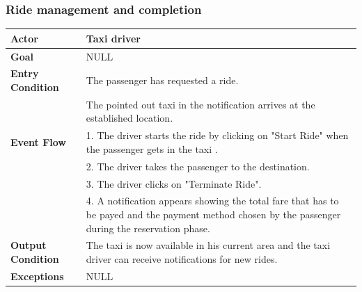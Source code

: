 \documentclass{article}
\begin{document}
\subsubsection{Ride management and completion}
\begin{tabular}{| l | p{8cm} |}
\hline
\textbf{Actor}      &       Taxi driver \\
\hline
\textbf{Goal}       &       NULL\\
\hline
\textbf{Entry Condition} &  The passenger has requested a ride.\\& The pointed out taxi in the notification arrives at the established location.\\
\hline
\textbf{Event Flow}     &           1.	The driver starts the ride by clicking on "Start Ride" when the passenger gets in the taxi .\\&
                                    2.	The driver takes the passenger to the destination.\\&
                                    3.	The driver clicks on "Terminate Ride".\\&
                                    4.  A notification appears showing the total fare that has to be payed and the payment method chosen by the passenger during the reservation phase.\\
\hline
\textbf{Output Condition} & The taxi is now available in his current area and the taxi driver can receive notifications for new rides.\\
\hline
\textbf{Exceptions} &    NULL\\
\hline
\end{tabular}
\end{document}
